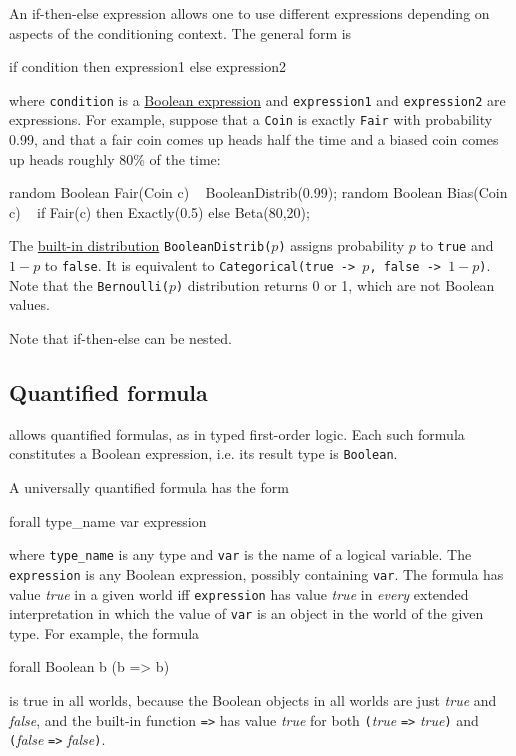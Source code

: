 \documentclass[12pt]{article}
\begin{document}
An if-then-else expression allows one to use different expressions depending on aspects of the conditioning context.
The general form is
\begin{blogcode}
if condition then expression1 else expression2
\end{blogcode}
where \texttt{condition} is a \hyperref[builtin-operator-appendix]{Boolean expression} and \texttt{expression1} and \texttt{expression2}
are expressions. For example, suppose that a {\tt Coin} is exactly {\tt Fair} with probability 0.99, and that
a fair coin comes up heads half the time and a biased coin comes up heads roughly 80\% of the time:
\begin{blogcode}
random Boolean Fair(Coin c) ~ BooleanDistrib(0.99);
random Boolean Bias(Coin c) ~  
  if Fair(c) then Exactly(0.5) 
  else Beta(80,20);
\end{blogcode}
The \hyperref[builtin-distribution-appendix]{built-in distribution}
{\tt BooleanDistrib($p$)} assigns probability $p$ to {\tt true} and
$1-p$ to {\tt false}. It is equivalent to {\tt Categorical({true ->
    $p$, false -> $1-p$})}. Note that the {\tt Bernoulli($p$)}
distribution returns 0 or 1, which are not Boolean values. 

Note that if-then-else can be nested. 



\subsection{Quantified formula}\label{quantifier-section}
\bl allows quantified formulas, as in typed first-order logic. 
Each such formula constitutes a Boolean expression, i.e. its result type is \verb|Boolean|.

A universally quantified formula has the form
\begin{blogcode}
forall type_name var expression
\end{blogcode}
where {\tt type\_name} is any type and {\tt var} is the name of a
logical variable. The {\tt expression} is any Boolean expression,
possibly containing {\tt var}. The formula has value {\it true}
in a given world iff {\tt expression} has value {\it true}
in {\em every} extended interpretation in which the value of {\tt var} 
is an object in the world of the given type. For example, the formula
\begin{blogcode}
forall Boolean b (b => b)
\end{blogcode}
is true in all worlds, because the Boolean objects in all worlds are 
just {\it true} and {\it false}, and the built-in function {\tt =>}
has value {\it true} for both {\tt (}{\it true} {\tt =>} {\it true}{\tt )}
and {\tt (}{\it false} {\tt =>} {\it false}{\tt )}.
\end{document}
